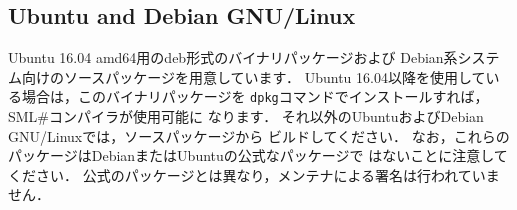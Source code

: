 \documentclass{jbook}
\newcommand{\txt}[2]{#2}
\newcommand{\smlsharp}{SML\#}
\begin{document}
\fi%

\subsection{\txt{UbuntuおよびDebian GNU/Linux}{Ubuntu and Debian GNU/Linux}}
\label{sec:ubuntu}

\ifjp%
	Ubuntu 16.04 amd64用のdeb形式のバイナリパッケージおよび
Debian系システム向けのソースパッケージを用意しています．
	Ubuntu 16.04以降を使用している場合は，このバイナリパッケージを
{\tt dpkg}コマンドでインストールすれば，\smlsharp{}コンパイラが使用可能に
なります．
	それ以外のUbuntuおよびDebian GNU/Linuxでは，ソースパッケージから
ビルドしてください．
	なお，これらのパッケージはDebianまたはUbuntuの公式なパッケージで
はないことに注意してください．
	公式のパッケージとは異なり，メンテナによる署名は行われていません．
\end{document}
